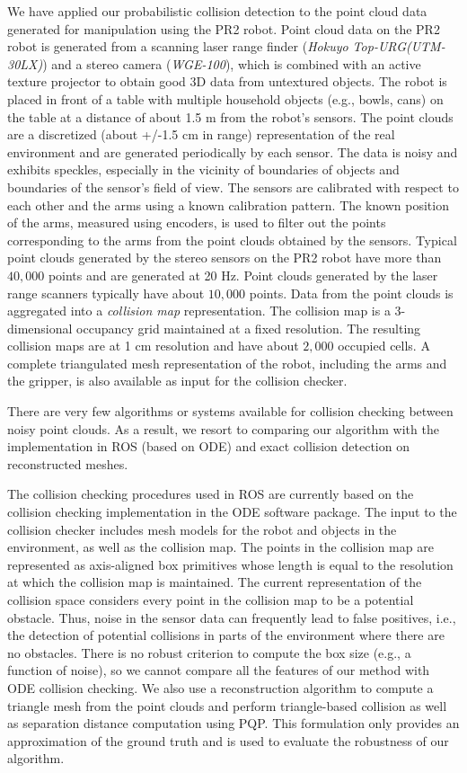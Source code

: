 We have applied our probabilistic collision detection to the point cloud data generated for manipulation using the PR2 robot. Point cloud data on the PR2 robot is generated from a scanning laser range finder (\emph{Hokuyo Top-URG(UTM-30LX)}) and a stereo camera (\emph{WGE-100}), which is combined with an active texture projector to obtain good 3D data from untextured objects. The robot is placed in front of a table with multiple household objects (e.g., bowls, cans) on the table at a distance of about 1.5 m from the robot's sensors. The point clouds are a discretized (about +/-1.5 cm in range) representation of the real environment and are generated periodically by each sensor. The data is noisy and exhibits speckles, especially in the vicinity of boundaries of objects and boundaries of the sensor's field of view. The sensors are calibrated with respect to each other and the arms using a known calibration pattern. The known position of the arms, measured using encoders, is used to filter out the points corresponding to the arms from the point clouds obtained by the sensors. Typical point clouds generated by the stereo sensors on the PR2 robot have more than $40,000$ points and are generated at 20 Hz. Point clouds generated by the laser range scanners typically have about $10,000$ points. Data from the point clouds is aggregated into a {\em collision map} representation. The collision map is a 3-dimensional occupancy grid maintained at a fixed resolution. The resulting collision maps are at 1 cm resolution and have about $2,000$ occupied cells. A complete triangulated mesh representation of the robot, including the arms and the gripper, is also available as input for the collision checker.

There are very few algorithms or systems available for collision checking between noisy point clouds. As a result, we resort to comparing our algorithm with the implementation in ROS (based on ODE) and exact collision detection on reconstructed meshes.

The collision checking procedures used in ROS are currently based on the collision checking implementation in the ODE software package. The input to the collision checker includes mesh models for the robot and objects in the environment, as well as the collision map. The points in the collision map are represented as axis-aligned box primitives whose length is equal to the resolution at which the collision map is maintained. The current representation of the collision space considers every point in the collision map to be a potential obstacle. Thus, noise in the sensor data can frequently lead to false positives, i.e., the detection of potential collisions in parts of the environment where there are no obstacles. There is no robust criterion to compute the box size (e.g., a function of noise), so we cannot compare all the features of our method with ODE collision checking. We also use a reconstruction algorithm to compute a triangle mesh from the point clouds and perform triangle-based collision as well as separation distance computation using PQP. This formulation only provides an approximation of the ground truth and is used to evaluate the robustness of our algorithm.

